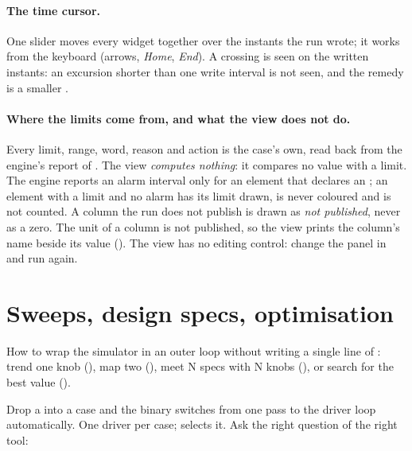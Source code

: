 \documentclass[11pt,a4paper]{article}
\begin{document}
\paragraph{The time cursor.}  One slider moves every widget together over the
instants the run wrote; it works from the keyboard (arrows, \emph{Home},
\emph{End}).  A crossing is seen on the written instants: an excursion
shorter than one write interval is not seen, and the remedy is a smaller
.

\paragraph{Where the limits come from, and what the view does not do.}
Every limit, range, word, reason and action is the case's own, read back from
the engine's report of .  The view \emph{computes
nothing}: it compares no value with a limit.  The engine reports an alarm
interval only for an element that declares an ; an element with a
limit and no alarm has its limit drawn, is never coloured and is not
counted.  A column the run does not publish is drawn as \emph{not published},
never as a zero.  The unit of a column is not published, so the view prints
the column's name beside its value ().  The view has no
editing control: change the panel in  and run again.

\section{Sweeps, design specs, optimisation}\label{sec:outer}

\begin{whatyoulllearn}
How to wrap the simulator in an outer loop without writing a single
line of \cpp: trend one knob (), map two
(), meet N specs with N knobs (), or
search for the best value ().
\end{whatyoulllearn}

Drop a  into a case and the binary switches from
one pass to the driver loop automatically.  One driver per case;
 selects it.  Ask the right question of the right tool:
\end{document}
